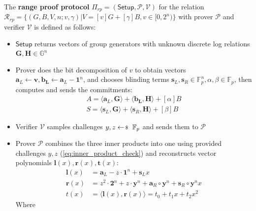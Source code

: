 \documentclass[../lecture-notes-148x210.tex]{subfiles}
\begin{document}
\begin{definition}
    The \textbf{range proof protocol} $\Pi_{rp} = (\mathsf{Setup}, \mathcal{P,V})$ for the relation $\mathcal{R}_{rp} = \{ (G, B, V, n; v, \gamma) \vert V = [v]G + [\gamma]B, v \in [0, 2^n) \}$ with prover $\mathcal{P}$ and verifier $\mathcal{V}$ is defined as follows:
    \begin{itemize}
        \item $\mathsf{Setup}$ returns vectors of group generators with unknown discrete log relations $\mathbf{G, H} \in \mathbb{G}^n$
        \item Prover does the bit decomposition of $v$ to obtain vectors $\mathbf{a}_L \gets \mathbf{v}, \mathbf{b_L} \gets \mathbf{a}_L - \mathbf{1}^n$, and chooses blinding terms $\mathbf{s}_L, \mathbf{s}_R \in \mathbb{F}_p^n, \alpha, \beta \in \mathbb{F}_p$, then computes and sends the commitments:
            \begin{align*}
                A = \langle \mathbf{a}_L, \mathbf{G} \rangle + \langle \mathbf{b_L}, \mathbf{H} \rangle + [\alpha]B\\
                S = \langle \mathbf{s}_L, \mathbf{G} \rangle + \langle \mathbf{s}_R, \mathbf{H} \rangle + [\beta]B
            \end{align*}
        \item Verifier $\mathcal{V}$ samples challenges $y, z \leftarrowS \mathbb{F}_p$ and sends them to $\mathcal{P}$
        \item Prover $\mathcal{P}$ combines the three inner products into one using provided challenges $y,z$ (\ref{eq:inner_product_check}) and reconstructs vector  polynomials $\mathbf{l}(x), \mathbf{r}(x), \mathbf{t}(x)$:
            \begin{equation*}
                \begin{aligned}
                    \mathbf{l}(x) &= \mathbf{a}_L - z \cdot \mathbf{1}^n + \mathbf{s}_L x\\
                    \mathbf{r}(x) &= z^2 \cdot \mathbf{2}^n + z \cdot \mathbf{y}^n + \mathbf{a}_R \circ \mathbf{y}^n + \mathbf{s}_R \circ \mathbf{y}^n x\\
                    t(x) &= \langle \mathbf{l}(x), \mathbf{r}(x) \rangle = t_0 + t_1 x + t_2 x^2
                \end{aligned}
            \end{equation*}
            Where 
            \begin{equation*}
                \begin{aligned}

\end{aligned}
\end{equation*}
\end{itemize}
\end{definition}
\end{document}

